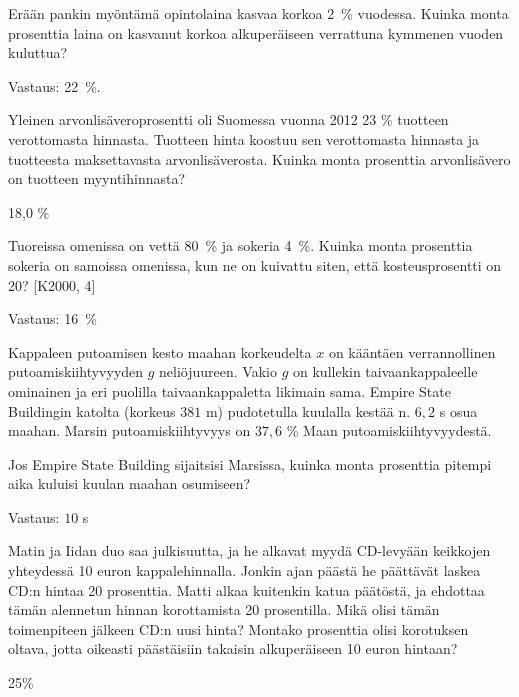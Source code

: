 \begin{tehtava}
    Erään pankin myöntämä opintolaina kasvaa korkoa 2~\% vuodessa. Kuinka monta prosenttia laina on kasvanut korkoa alkuperäiseen verrattuna kymmenen vuoden kuluttua?
    \begin{vastaus}
        Vastaus: 22~\%.
    \end{vastaus}
\end{tehtava}

\begin{tehtava}
Yleinen arvonlisäveroprosentti oli Suomessa vuonna 2012 23 \% tuotteen verottomasta
hinnasta. Tuotteen hinta koostuu sen verottomasta hinnasta
ja tuotteesta maksettavasta arvonlisäverosta. Kuinka monta
prosenttia arvonlisävero on tuotteen myyntihinnasta?
\begin{vastaus}
18,0 \%
\end{vastaus}
\end{tehtava}


\begin{tehtava}
    Tuoreissa omenissa on vettä 80~\% ja sokeria 4~\%. Kuinka monta prosenttia sokeria on samoissa omenissa, kun ne on kuivattu siten, että kosteusprosentti on 20? [K2000, 4]
    \begin{vastaus}
        Vastaus: 16~\%
    \end{vastaus}
\end{tehtava}

\begin{tehtava}
    Kappaleen putoamisen kesto maahan korkeudelta $x$ on kääntäen verrannollinen putoamiskiihtyvyyden $g$ neliöjuureen. Vakio $g$ on kullekin taivaankappaleelle ominainen ja eri puolilla taivaankappaletta likimain sama. Empire State Buildingin katolta (korkeus $381$ m) pudotetulla kuulalla kestää n. $6,2$ s osua maahan. Marsin putoamiskiihtyvyys on $37,6$ \% Maan putoamiskiihtyvyydestä. 
    
    Jos Empire State Building sijaitsisi Marsissa, kuinka monta prosenttia pitempi aika kuluisi kuulan maahan osumiseen?
    \begin{vastaus}
        Vastaus: $10$ s
    \end{vastaus}
\end{tehtava}

\begin{tehtava}
Matin ja Iidan duo saa julkisuutta, ja he alkavat myydä CD-levyään keikkojen yhteydessä 10 euron kappalehinnalla. Jonkin ajan päästä he päättävät laskea CD:n hintaa 20 prosenttia. Matti alkaa kuitenkin katua päätöstä, ja ehdottaa tämän alennetun hinnan korottamista 20 prosentilla. Mikä olisi tämän toimenpiteen jälkeen CD:n uusi hinta? Montako prosenttia olisi korotuksen oltava, jotta oikeasti päästäisiin takaisin alkuperäiseen 10 euron hintaan?
    \begin{vastaus}
25\%
    \end{vastaus}
\end{tehtava}

